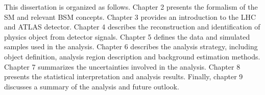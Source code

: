 \documentclass[../thesis.tex]{subfiles}
\begin{document}
This dissertation is organized as follows. Chapter 2 presents the formalism of the \acs{SM} and relevant \acs{BSM} concepts. Chapter 3 provides an introduction to the \acs{LHC} and \acs{ATLAS} detector. Chapter 4 describes the reconstruction and identification of physics object from detector signals. Chapter 5 defines the data and simulated samples used in the analysis. Chapter 6 describes the analysis strategy, including object definition, analysis region description and background estimation methods. Chapter 7 summarizes the uncertainties involved in the analysis. Chapter 8 presents the statistical interpretation and analysis results. Finally, chapter 9 discusses a summary of the analysis and future outlook.
\end{document}
